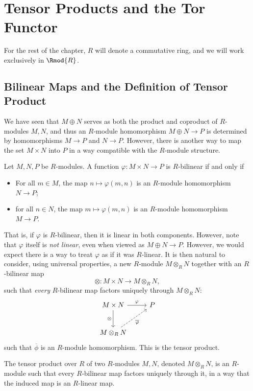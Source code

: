 \section{Tensor Products and the Tor Functor}
For the rest of the chapter, $R$ will denote a commutative ring, and we will work exclusively in $\Rmod{R} $.
\subsection{Bilinear Maps and the Definition of Tensor Product}
We have seen that $M\oplus N$ serves as both the product and coproduct of $R$-modules $M,N$, and thus an $R$-module homomorphism $M\oplus N\to P$ is determined by homomorphisms $M\to P$ and $N\to P$. However, there is another way to map the set $M\times N$ into $P$ in a way compatible with the $R$-module structure.
\begin{definition}[Bilinear]\label{dfn:8.8}
	Let $M,N,P$ be $R$-modules. A function $\varphi : M\times N \to P$ is $R$-bilinear if and only if
	\begin{itemize}
		\item For all $m\in M$, the map $n\mapsto \varphi (m,n)$ is an $R$-module homomorphism $N\to P$;
		\item for all $n\in N$, the map $m\mapsto \varphi (m,n)$ is an $R$-module homomorphism $M\to P$.
	\end{itemize}
\end{definition}

That is, if $\varphi $ is $R$-bilinear, then it is linear in both components. However, note that $\varphi $ itself is \emph{not linear}, even when viewed as $M\oplus N\to P$. However, we would expect there is a way to treat $\varphi $ as if it was $R$-linear. It is then natural to consider, using universal properties, a new $R$-module $M\otimes _RN$ together with an $R$-bilinear map
\[
	\otimes : M\times N \to M\otimes_R N
,\]
such that \emph{every} $R$-bilinear map factors uniquely through $M\otimes_R N$:
\[\begin{tikzcd}[row sep = 2.5em, column sep = 2.5em]
	M\times N\arrow[r, "\varphi "]\arrow[d, "\otimes "']&P\\
	M\otimes_R N\arrow[ru, dashed, "\overline{\varphi}"'] 
\end{tikzcd}\]
such that $\overline{\phi } $ is an $R$-module homomorphism. This is the tensor product.
\begin{definition}\label{dfn:8.9}
	The tensor product over $R$ of two $R$-modules $M,N$, denoted $M\otimes_R N$, is an $R$-module such that every $R$-bilinear map factors uniquely through it, in a way that the induced map is an $R$-linear map.
\end{definition}

